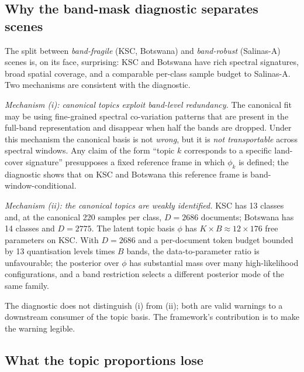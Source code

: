 \documentclass[journal,a4paper,10pt]{IEEEtran}
\begin{document}
\subsection{Why the band-mask diagnostic separates scenes}

The split between \emph{band-fragile} (KSC, Botswana) and
\emph{band-robust} (Salinas-A) scenes is, on its face, surprising:
KSC and Botswana have rich spectral signatures, broad spatial
coverage, and a comparable per-class sample budget to Salinas-A. Two
mechanisms are consistent with the diagnostic.

\emph{Mechanism (i): canonical topics exploit band-level redundancy.}
The canonical fit may be using fine-grained spectral co-variation
patterns that are present in the full-band representation and disappear
when half the bands are dropped. Under this mechanism the canonical
basis is not \emph{wrong}, but it is \emph{not transportable} across
spectral windows. Any claim of the form ``topic $k$ corresponds to a
specific land-cover signature'' presupposes a fixed reference frame
in which $\phi_k$ is defined; the diagnostic shows that on KSC and
Botswana this reference frame is band-window-conditional.

\emph{Mechanism (ii): the canonical topics are weakly identified.}
KSC has 13 classes and, at the canonical 220 samples per class,
$D = 2686$ documents; Botswana has 14 classes and $D = 2775$. The latent topic basis
$\phi$ has $K \times B \approx 12 \times 176$ free parameters on KSC.
With $D = 2686$ and a per-document token budget bounded by 13
quantisation levels times $B$ bands, the data-to-parameter ratio is
unfavourable; the posterior over $\phi$ has substantial mass over
many high-likelihood configurations, and a band restriction selects a
different posterior mode of the same family.

The diagnostic does not distinguish (i) from (ii); both are valid
warnings to a downstream consumer of the topic basis. The framework's
contribution is to make the warning legible.

\subsection{What the topic proportions lose}
\end{document}
